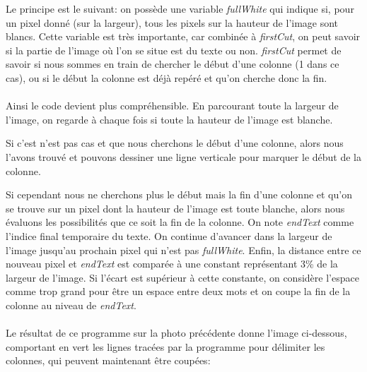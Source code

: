 \documentclass{article}
\begin{document}
	\vspace*{0.5cm}
	\par
	Le principe est le suivant: on possède une variable \textit{fullWhite} qui indique si, pour un pixel donné (sur la largeur), tous les pixels sur la hauteur de l'image sont blancs. Cette variable est très importante, car combinée à \textit{firstCut}, on peut savoir si la partie de l'image où l'on se situe est du texte ou non. \textit{firstCut} permet de savoir si nous sommes en train de chercher le début d'une colonne (1 dans ce cas), ou si le début la colonne est déjà repéré et qu'on cherche donc la fin.
	
	\paragraph{}
	Ainsi le code devient plus compréhensible. En parcourant toute la largeur de l'image, on regarde à chaque fois si toute la hauteur de l'image est blanche. 
	\par
	Si c'est n'est pas cas et que nous cherchons le début d'une colonne, alors nous l'avons trouvé et pouvons dessiner une ligne verticale pour marquer le début de la colonne.
	\par
	Si cependant nous ne cherchons plus le début mais la fin d'une colonne et qu'on se trouve sur un pixel dont la hauteur de l'image est toute blanche, alors nous évaluons les possibilités que ce soit la fin de la colonne. On note \textit{endText} comme l'indice final temporaire du texte. On continue d'avancer dans la largeur de l'image jusqu'au prochain pixel qui n'est pas \textit{fullWhite}. Enfin, la distance entre ce nouveau pixel et \textit{endText} est comparée à une constant représentant 3\% de la largeur de l'image. Si l'écart est supérieur à cette constante, on considère l'espace comme trop grand pour être un espace entre deux mots et on coupe la fin de la colonne au niveau de \textit{endText}. \\
	
	\paragraph{}
	Le résultat de ce programme sur la photo précédente donne l'image ci-dessous, comportant en vert les lignes tracées par la programme pour délimiter les colonnes, qui peuvent maintenant être coupées: \\
	
\end{document}
